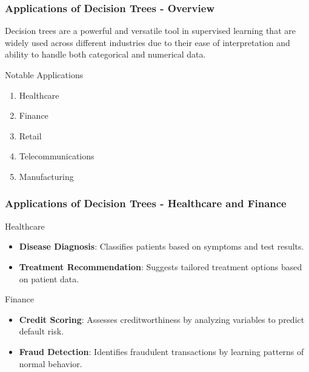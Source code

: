 \documentclass[aspectratio=169]{beamer}
\begin{document}
\begin{frame}[fragile]
  \frametitle{Applications of Decision Trees - Overview}
  Decision trees are a powerful and versatile tool in supervised learning that are widely used across different industries due to their ease of interpretation and ability to handle both categorical and numerical data. 
  \begin{block}{Notable Applications}
    \begin{enumerate}
      \item Healthcare
      \item Finance
      \item Retail
      \item Telecommunications
      \item Manufacturing
    \end{enumerate}
  \end{block}
\end{frame}

\begin{frame}[fragile]
  \frametitle{Applications of Decision Trees - Healthcare and Finance}
  \begin{block}{Healthcare}
    \begin{itemize}
      \item \textbf{Disease Diagnosis}: Classifies patients based on symptoms and test results.
      \item \textbf{Treatment Recommendation}: Suggests tailored treatment options based on patient data.
    \end{itemize}
  \end{block}
  
  \begin{block}{Finance}
    \begin{itemize}
      \item \textbf{Credit Scoring}: Assesses creditworthiness by analyzing variables to predict default risk.
      \item \textbf{Fraud Detection}: Identifies fraudulent transactions by learning patterns of normal behavior.
    \end{itemize}
  \end{block}
\end{frame}
\end{document}
